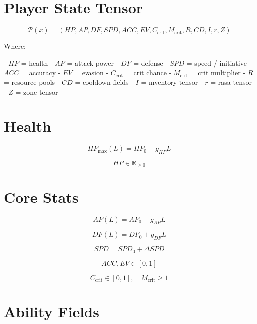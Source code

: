 
\section*{Player State Tensor}

\[
\mathcal{P}(x)
= (HP, AP, DF, SPD, ACC, EV, C_{\text{crit}}, M_{\text{crit}},
R, CD, I, r, Z)
\]

Where:

- \(HP\) = health  
- \(AP\) = attack power  
- \(DF\) = defense  
- \(SPD\) = speed / initiative  
- \(ACC\) = accuracy  
- \(EV\) = evasion  
- \(C_{\text{crit}}\) = crit chance  
- \(M_{\text{crit}}\) = crit multiplier  
- \(R\) = resource pools  
- \(CD\) = cooldown fields  
- \(I\) = inventory tensor  
- \(r\) = rasa tensor  
- \(Z\) = zone tensor  


\section*{Health}

\[
HP_{\max}(L) = HP_0 + g_{HP} L
\]

\[
HP \in \mathbb{R}_{\ge 0}
\]


\section*{Core Stats}

\[
AP(L) = AP_0 + g_{AP} L
\]

\[
DF(L) = DF_0 + g_{DF} L
\]

\[
SPD = SPD_0 + \Delta SPD
\]

\[
ACC, EV \in [0,1]
\]

\[
C_{\text{crit}} \in [0,1],\quad
M_{\text{crit}} \ge 1
\]


\section*{Ability Fields}

